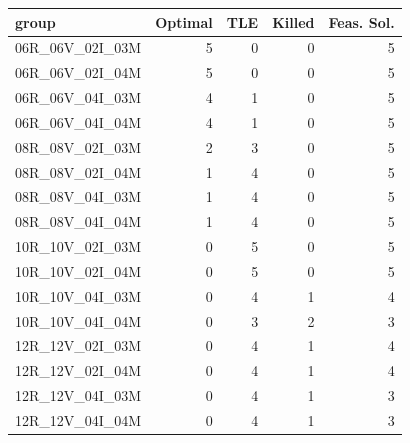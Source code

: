 
\begin{tabular}{lrrrr}
\toprule
group & Optimal & TLE & Killed & Feas. Sol.\\
\midrule
06R\_06V\_02I\_03M & 5 & 0 & 0 & 5\\
06R\_06V\_02I\_04M & 5 & 0 & 0 & 5\\
06R\_06V\_04I\_03M & 4 & 1 & 0 & 5\\
06R\_06V\_04I\_04M & 4 & 1 & 0 & 5\\
08R\_08V\_02I\_03M & 2 & 3 & 0 & 5\\
\addlinespace
08R\_08V\_02I\_04M & 1 & 4 & 0 & 5\\
08R\_08V\_04I\_03M & 1 & 4 & 0 & 5\\
08R\_08V\_04I\_04M & 1 & 4 & 0 & 5\\
10R\_10V\_02I\_03M & 0 & 5 & 0 & 5\\
10R\_10V\_02I\_04M & 0 & 5 & 0 & 5\\
\addlinespace
10R\_10V\_04I\_03M & 0 & 4 & 1 & 4\\
10R\_10V\_04I\_04M & 0 & 3 & 2 & 3\\
12R\_12V\_02I\_03M & 0 & 4 & 1 & 4\\
12R\_12V\_02I\_04M & 0 & 4 & 1 & 4\\
12R\_12V\_04I\_03M & 0 & 4 & 1 & 3\\
\addlinespace
12R\_12V\_04I\_04M & 0 & 4 & 1 & 3\\
\bottomrule
\end{tabular}
